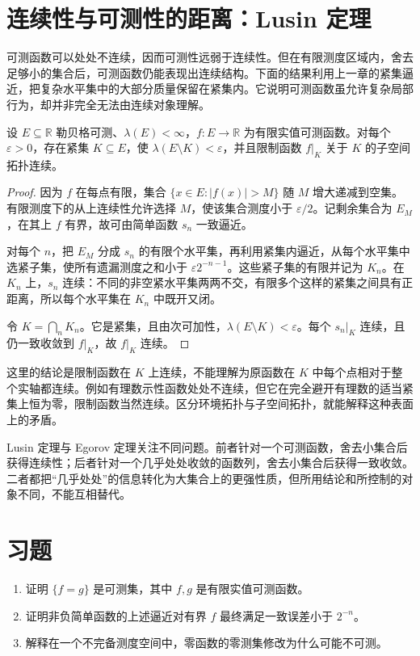 \documentclass[UTF8,12pt,a4paper,fontset=fandol]{ctexbook}
\begin{document}
\section{连续性与可测性的距离：Lusin 定理}
\label{sec:mt-lusin}
可测函数可以处处不连续，因而可测性远弱于连续性。但在有限测度区域内，舍去足够小的集合后，可测函数仍能表现出连续结构。下面的结果利用上一章的紧集逼近，把复杂水平集中的大部分质量保留在紧集内。它说明可测函数虽允许复杂局部行为，却并非完全无法由连续对象理解。

\begin{theorem}
设 $E\subseteq\mathbb R$ 勒贝格可测、$\lambda(E)<\infty$，$f:E\to\mathbb R$ 为有限实值可测函数。对每个 $\varepsilon>0$，存在紧集 $K\subseteq E$，使 $\lambda(E\setminus K)<\varepsilon$，并且限制函数 $f|_K$ 关于 $K$ 的子空间拓扑连续。
\label{thm:mt-lusin}
\end{theorem}
\begin{proof}
因为 $f$ 在每点有限，集合 $\{x\in E:|f(x)|>M\}$ 随 $M$ 增大递减到空集。有限测度下的从上连续性允许选择 $M$，使该集合测度小于 $\varepsilon/2$。记剩余集合为 $E_M$，在其上 $f$ 有界，故可由简单函数 $s_n$ 一致逼近。

对每个 $n$，把 $E_M$ 分成 $s_n$ 的有限个水平集，再利用紧集内逼近，从每个水平集中选紧子集，使所有遗漏测度之和小于 $\varepsilon2^{-n-1}$。这些紧子集的有限并记为 $K_n$。在 $K_n$ 上，$s_n$ 连续：不同的非空紧水平集两两不交，有限多个这样的紧集之间具有正距离，所以每个水平集在 $K_n$ 中既开又闭。

令 $K=\bigcap_nK_n$。它是紧集，且由次可加性，$\lambda(E\setminus K)<\varepsilon$。每个 $s_n|_K$ 连续，且仍一致收敛到 $f|_K$，故 $f|_K$ 连续。
\end{proof}

这里的结论是限制函数在 $K$ 上连续，不能理解为原函数在 $K$ 中每个点相对于整个实轴都连续。例如有理数示性函数处处不连续，但它在完全避开有理数的适当紧集上恒为零，限制函数当然连续。区分环境拓扑与子空间拓扑，就能解释这种表面上的矛盾。

Lusin 定理与 Egorov 定理关注不同问题。前者针对一个可测函数，舍去小集合后获得连续性；后者针对一个几乎处处收敛的函数列，舍去小集合后获得一致收敛。二者都把“几乎处处”的信息转化为大集合上的更强性质，但所用结论和所控制的对象不同，不能互相替代。

\section{习题}
\begin{enumerate}
 \item 证明 $\{f=g\}$ 是可测集，其中 $f,g$ 是有限实值可测函数。
 \item 证明非负简单函数的上述逼近对有界 $f$ 最终满足一致误差小于 $2^{-n}$。
 \item 解释在一个不完备测度空间中，零函数的零测集修改为什么可能不可测。
\end{enumerate}
\end{document}
